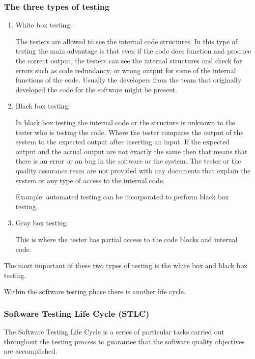 \documentclass[a4paper]{article}
\begin{document}
\subsubsection{The three types of testing }
\begin{enumerate}
    \item White box testing:


        The testers are allowed to see the internal code structures. In this type of testing the main advantage is that even if the code does function
        and produce the correct output, the testers can see the internal structures and check for errors such as code redundancy, or wrong output for
        some of the internal functions of the code. Usually the developers from the team that originally developed the code for the software might be 
        present.

    \item Black box testing:

        In black box testing the internal code or the structure is unknown to the tester who is testing the code. Where the tester compares the output 
        of the system to the expected output after inserting an input. If the expected output and the actual output are not exactly the same then that 
        means that there is an error or an bug in the software or the system. The tester or the quality assurance 
        team are not provided with any documents that 
        explain the system or any type of access to the internal code.

Example: automated testing can be incorporated to perform black box testing.

    \item Gray box testing: 

        This is where the tester has partial access to the code blocks and internal code. 

\end{enumerate}

The most important of these two types of testing is the white box and black box testing.

Within the software testing phase there is another life cycle.

\subsubsection{Software Testing Life Cycle (STLC)}
The Software Testing Life Cycle is a series of particular
tasks carried out throughout the testing process to guarantee that the software quality objectives are accomplished.
\end{document}
